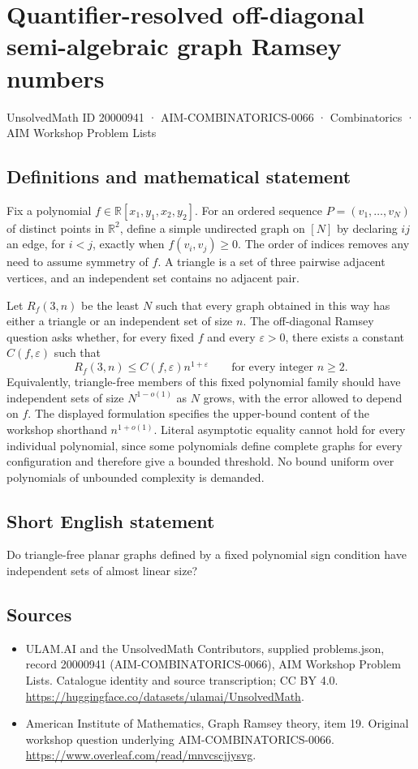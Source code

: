 \documentclass[11pt,a4paper]{article}
\begin{document}
\section*{Quantifier-resolved off-diagonal semi-algebraic graph Ramsey numbers}\label{20000941}
{\small UnsolvedMath ID 20000941 · AIM-COMBINATORICS-0066 · Combinatorics · AIM Workshop Problem Lists}
\subsection{Definitions and mathematical statement}
Fix a polynomial $f\in\mathbb R[x_1,y_1,x_2,y_2]$.
For an ordered sequence $P=(v_1,\ldots,v_N)$ of distinct points in $\mathbb R^2$, define a simple undirected graph on $[N]$ by declaring $ij$ an edge, for $i<j$, exactly when $f(v_i,v_j)\geq0$.
The order of indices removes any need to assume symmetry of $f$.
A triangle is a set of three pairwise adjacent vertices, and an independent set contains no adjacent pair.

Let $R_f(3,n)$ be the least $N$ such that every graph obtained in this way has either a triangle or an independent set of size $n$.
The off-diagonal Ramsey question asks whether, for every fixed $f$ and every $\varepsilon>0$, there exists a constant $C(f,\varepsilon)$ such that
\[
 R_f(3,n)\leq C(f,\varepsilon)n^{1+\varepsilon}
 \qquad\text{for every integer }n\geq2.
\]
Equivalently, triangle-free members of this fixed polynomial family should have independent sets of size $N^{1-o(1)}$ as $N$ grows, with the error allowed to depend on $f$.
The displayed formulation specifies the upper-bound content of the workshop shorthand $n^{1+o(1)}$.
Literal asymptotic equality cannot hold for every individual polynomial, since some polynomials define complete graphs for every configuration and therefore give a bounded threshold.
No bound uniform over polynomials of unbounded complexity is demanded.
\subsection{Short English statement}
Do triangle-free planar graphs defined by a fixed polynomial sign condition have independent sets of almost linear size?
\subsection{Sources}
\begin{itemize}
\item[S1] ULAM.AI and the UnsolvedMath Contributors, supplied problems.json, record 20000941 (AIM-COMBINATORICS-0066), AIM Workshop Problem Lists. Catalogue identity and source transcription; CC BY 4.0.
\url{https://huggingface.co/datasets/ulamai/UnsolvedMath}.
\item[S2] American Institute of Mathematics, Graph Ramsey theory, item 19. Original workshop question underlying AIM-COMBINATORICS-0066.
\url{https://www.overleaf.com/read/mnvcscjjysvg}.
\end{itemize}
\end{document}
